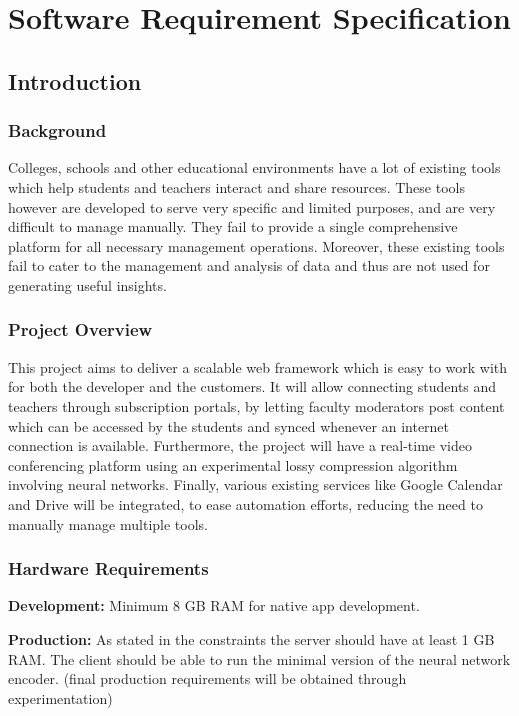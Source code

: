 \chapter{Software Requirement Specification}

\section{Introduction}

\subsection{Background}

Colleges, schools and other educational environments have a lot of existing tools 
which help students and teachers interact and share resources.
These tools however are developed to serve very specific and limited purposes, and are very difficult to 
manage manually. They fail to provide a single comprehensive platform for all 
necessary management operations. Moreover, these existing tools fail to cater to the 
management and analysis of data and thus are not used for generating useful 
insights.

\subsection{Project Overview}

This project aims to deliver a scalable web framework which is easy to work 
with for both the developer and the customers. It will allow connecting students and 
teachers through subscription portals, by letting faculty moderators post content 
which can be accessed by the students and synced whenever an internet connection 
is available. Furthermore, the project will have a real-time video conferencing platform 
using an experimental lossy compression algorithm involving neural networks. 
Finally, various existing services like Google Calendar and Drive will be integrated, to ease 
automation efforts, reducing the need to manually manage multiple tools.

\subsection{Hardware Requirements}

\textbf{Development:} 
Minimum 8 GB RAM for native app development.

\textbf{Production:} 
As stated in the constraints the server should have at least 1 GB RAM.
The client should be able to run the minimal version of the neural network encoder.
(final production requirements will be obtained through experimentation)

